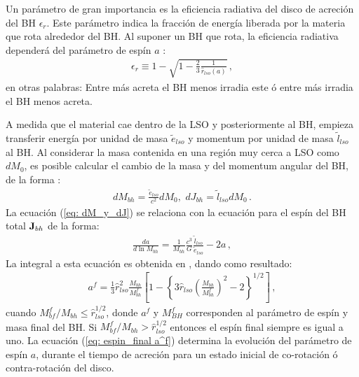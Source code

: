 %
Un parámetro de gran importancia es la eficiencia radiativa del disco de acreción del BH $\epsilon_{r}$. Este parámetro indica la fracción de energía liberada por la materia que rota alrededor del BH. Al suponer un BH que rota, la eficiencia radiativa dependerá del parámetro de espín $a$ \cite{novikov1973}:
%
\begin{align}
    \epsilon_{r} \equiv 1- \sqrt{1-\frac{2}{3}\frac{1}{\hat{r}_{lso}(a)}}\,,
    \label{eq: eficiencia radiativa}
\end{align}
%
en otras palabras: Entre más acreta el BH menos irradia este ó entre más irradia el BH menos acreta.

A medida que el material cae dentro de la LSO y posteriormente al BH, empieza transferir energía por unidad de masa $\widetilde{e}_{lso}$ y  momentum por unidad de masa $\widetilde{l}_{lso}$ al BH. Al considerar la masa contenida en una región muy cerca a LSO  como $dM_{0}$, es posible  calcular el cambio de la masa y del momentum angular del BH, de la forma \cite{fanidakis2011}:
%
\begin{align}
    dM_{bh}=\frac{\widetilde{e}_{lso}}{c^{2}}dM_{0}, \, \, dJ_{bh}=\widetilde{l}_{lso}dM_{0}\,.
    \label{eq: dM_y_dJ}
\end{align}
%
La ecuación (\ref{eq: dM_y_dJ}) se relaciona con la ecuación para el espín del BH total ${\bf{J}}_{bh}$ de la forma:
%
\begin{align}
    \frac{da}{d\ln{M_{bh}}}=\frac{1}{M_{bh}}\frac{c^{3}}{G}\frac{\widetilde{l}_{lso}}{\widetilde{e}_{lso}}-2a\,,
    \label{eq: evolucion_espin}
\end{align}
%
La integral a esta ecuación es obtenida en \cite{bardeen1970}, dando como resultado: 
\begin{align}
    a^{f}=\frac{1}{3}\hat{r}_{lso}^{2}\frac{M_{bh}}{M_{bh}^{f}}\left[1- \left\{3\hat{r}_{lso}\left(\frac{M_{bh}}{M^{f}_{bh}} \right)^{2}-2 \right\}^{1/2} \right]\,,
    \label{eq: espin_final a^f}
\end{align}
cuando $M_{bf}^{f}/M_{bh} \leq \hat{r}_{lso}^{1/2} $, donde $a^{f}$ y $M_{BH}^{f}$ corresponden al parámetro de espín y masa final del BH. Si  $M_{bf}^{f}/M_{bh} > \hat{r}_{lso}^{1/2} $ entonces el espín final siempre es igual a uno.
La ecuación (\ref{eq: espin_final a^f}) determina la evolución del parámetro de espín $a$, durante el tiempo de acreción para un estado inicial de co-rotación ó contra-rotación del disco. 

